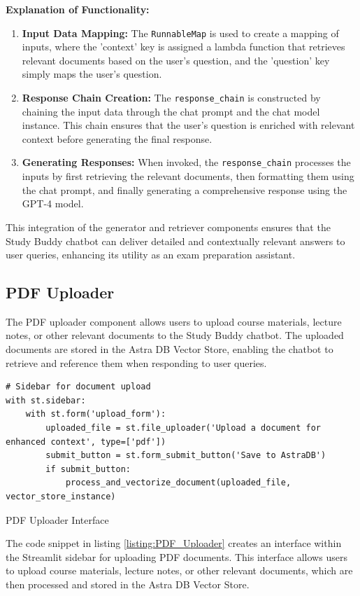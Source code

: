 \textbf{Explanation of Functionality:}
\begin{enumerate}
    \item \textbf{Input Data Mapping:} The \texttt{RunnableMap} is used to create a mapping of inputs, where the 'context' key is assigned a lambda function that retrieves relevant documents based on the user's question, and the 'question' key simply maps the user's question.
    \item \textbf{Response Chain Creation:} The \texttt{response\_chain} is constructed by chaining the input data through the chat prompt and the chat model instance. This chain ensures that the user's question is enriched with relevant context before generating the final response.
    \item \textbf{Generating Responses:} When invoked, the \texttt{response\_chain} processes the inputs by first retrieving the relevant documents, then formatting them using the chat prompt, and finally generating a comprehensive response using the GPT-4 model.
\end{enumerate}

This integration of the generator and retriever components ensures that the Study Buddy chatbot can deliver detailed and contextually relevant answers to user queries, enhancing its utility as an exam preparation assistant.

\subsection{PDF Uploader}
The PDF uploader component allows users to upload course materials, lecture notes, or other relevant documents to the Study Buddy chatbot. The uploaded documents are stored in the Astra DB Vector Store, enabling the chatbot to retrieve and reference them when responding to user queries.

\begin{listing}[H]
\begin{verbatim}
# Sidebar for document upload
with st.sidebar:
    with st.form('upload_form'):
        uploaded_file = st.file_uploader('Upload a document for enhanced context', type=['pdf'])
        submit_button = st.form_submit_button('Save to AstraDB')
        if submit_button:
            process_and_vectorize_document(uploaded_file, vector_store_instance)
\end{verbatim}
\caption{PDF Uploader Interface}
\label{listing:PDF_Uploader}
\end{listing}
The code snippet in listing \ref{listing:PDF_Uploader} creates an interface within the Streamlit sidebar for uploading PDF documents. This interface allows users to upload course materials, lecture notes, or other relevant documents, which are then processed and stored in the Astra DB Vector Store.

